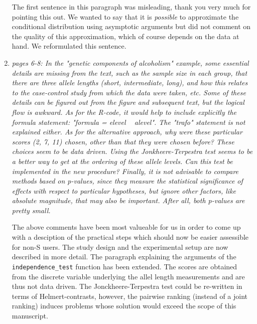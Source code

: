 \documentclass[11pt]{article}
\begin{document}
\begin{enumerate}
The first sentence in this paragraph was misleading, thank you very much for
pointing this out. We wanted to say that it is \textit{possible} to
approximate the conditional distribution using asymptotic arguments but did
not comment on the quality of this approximation, which of course depends on
the data at hand. We reformulated this sentence.

\item \textsl{pages 6-8:  In the "genetic components of alcoholism" example, some essential details are 
              missing from the text, such as the sample size in each group, that there are three allele 
              lengths (short, intermediate, long), and how this relates to the case-control study from 
              which the data were taken, etc. Some of these details can be figured out from the figure 
              and subsequent text, but the logical flow is awkward.  As for the R-code, it would help 
              to include explicitly the formula statement: "formula = elevel ~ alevel". The "trafo" 
              statement is not explained either.  As for the alternative approach, why were these 
              particular scores (2, 7, 11) chosen, other than that they were chosen before? 
              These choices seem to be data driven. 
              Using the Jonkheere-Terpestra test seems to be a better way to get at the ordering of 
              these allele levels. Can this test be implemented in the new procedure? 
              Finally, it is not advisable to compare methods based on p-values, since they measure 
              the statistical significance of effects with respect to particular hypotheses, but 
              ignore other factors, like absolute magnitude, that may also be important. After all, 
              both p-values are pretty small.}

The above comments have been most valueable for us in order to come up with
a desciption of the practical steps which should now be easier 
assessible for non-\textsf{S}
users. The study design and the experimental setup are now described in more
detail. The paragraph explaining the arguments of the
\texttt{independence\_test} function has been extended. The scores are
obtained from the discrete variable underlying the allel length measurements
and are thus not data driven. The Jonckheere-Terpestra test 
could be re-written in
terms of Helmert-contrasts, however, the pairwise ranking (instead of a
joint ranking) induces problems whose solution would exceed the scope of
this manuscript.


\end{enumerate}
\end{document}
